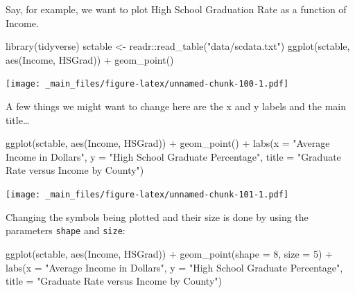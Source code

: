 \documentclass[
]{book}
\newenvironment{Shaded}{\begin{snugshade}}{\end{snugshade}}
\newcommand{\AttributeTok}[1]{\textcolor[rgb]{0.77,0.63,0.00}{#1}}
\newcommand{\DecValTok}[1]{\textcolor[rgb]{0.00,0.00,0.81}{#1}}
\newcommand{\FunctionTok}[1]{\textcolor[rgb]{0.00,0.00,0.00}{#1}}
\newcommand{\NormalTok}[1]{#1}
\newcommand{\OtherTok}[1]{\textcolor[rgb]{0.56,0.35,0.01}{#1}}
\newcommand{\SpecialCharTok}[1]{\textcolor[rgb]{0.00,0.00,0.00}{#1}}
\newcommand{\StringTok}[1]{\textcolor[rgb]{0.31,0.60,0.02}{#1}}
\begin{document}
Say, for example, we want to plot High School Graduation Rate as a function of Income.

\begin{Shaded}
\begin{Highlighting}[]
\FunctionTok{library}\NormalTok{(tidyverse)}
\NormalTok{sctable }\OtherTok{\textless{}{-}}\NormalTok{ readr}\SpecialCharTok{::}\FunctionTok{read\_table}\NormalTok{(}\StringTok{"data/scdata.txt"}\NormalTok{)}
\FunctionTok{ggplot}\NormalTok{(sctable, }\FunctionTok{aes}\NormalTok{(Income, HSGrad)) }\SpecialCharTok{+}
  \FunctionTok{geom\_point}\NormalTok{()}
\end{Highlighting}
\end{Shaded}

\texttt{[image: \_main\_files/figure-latex/unnamed-chunk-100-1.pdf]}

A few things we might want to change here are the x and y labels and the main title\ldots{}

\begin{Shaded}
\begin{Highlighting}[]
\FunctionTok{ggplot}\NormalTok{(sctable, }\FunctionTok{aes}\NormalTok{(Income, HSGrad)) }\SpecialCharTok{+}
  \FunctionTok{geom\_point}\NormalTok{() }\SpecialCharTok{+}
  \FunctionTok{labs}\NormalTok{(}\AttributeTok{x =} \StringTok{"Average Income in Dollars"}\NormalTok{,}
       \AttributeTok{y =} \StringTok{"High School Graduate Percentage"}\NormalTok{,}
       \AttributeTok{title =} \StringTok{"Graduate Rate versus Income by County"}\NormalTok{)}
\end{Highlighting}
\end{Shaded}

\texttt{[image: \_main\_files/figure-latex/unnamed-chunk-101-1.pdf]}

Changing the symbols being plotted and their size is done by using the parameters \texttt{shape} and \texttt{size}:

\begin{Shaded}
\begin{Highlighting}[]
\FunctionTok{ggplot}\NormalTok{(sctable, }\FunctionTok{aes}\NormalTok{(Income, HSGrad)) }\SpecialCharTok{+}
  \FunctionTok{geom\_point}\NormalTok{(}\AttributeTok{shape =} \DecValTok{8}\NormalTok{, }\AttributeTok{size =} \DecValTok{5}\NormalTok{) }\SpecialCharTok{+}
  \FunctionTok{labs}\NormalTok{(}\AttributeTok{x =} \StringTok{"Average Income in Dollars"}\NormalTok{,}
       \AttributeTok{y =} \StringTok{"High School Graduate Percentage"}\NormalTok{,}
       \AttributeTok{title =} \StringTok{"Graduate Rate versus Income by County"}\NormalTok{)}
\end{Highlighting}
\end{Shaded}
\end{document}

